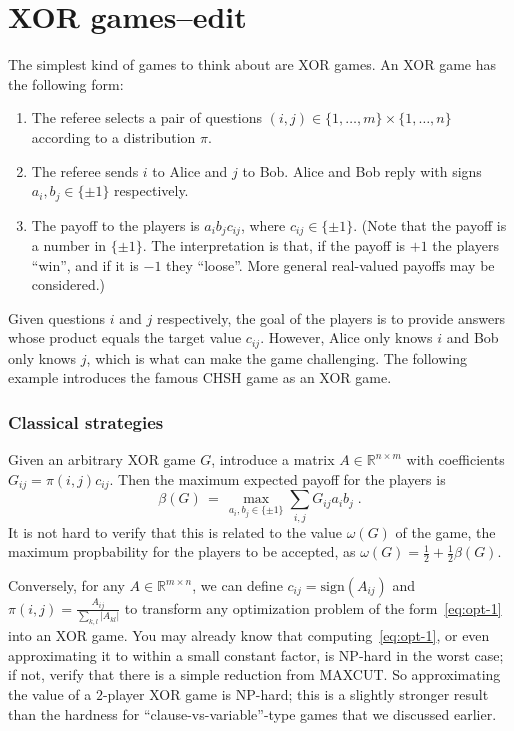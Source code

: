 \documentclass{report}
\theoremstyle{plain}
\theoremstyle{definition}
\theoremstyle{remark}
\newcommand{\R}{\ensuremath{\mathbb{R}}}
\numberwithin{equation}{subsection}
\begin{document}
\chapter{XOR games--edit}
\label{chapzz:xorgames}

The simplest kind of games to think about are XOR games. An XOR game has the following form:
\begin{enumerate}
  \item The referee selects a pair of questions $(i,j)\in \{1,\ldots, m\}\times \{1,\ldots, n\}$
   according to a distribution $\pi$. 
  \item The referee sends $i$ to Alice and $j$ to Bob. Alice and Bob reply with signs $a_i,b_j\in\{\pm 1\}$ respectively.
  \item The payoff to the players is $a_ib_jc_{ij}$, where $c_{ij}\in\{\pm 1\}$. (Note that the payoff is a number in $\{\pm 1\}$. The interpretation is that, if the payoff is $+1$ the players ``win'', and if it is $-1$ they ``loose''. More general real-valued payoffs may be considered.)
\end{enumerate}
Given questions $i$ and $j$ respectively, the goal of the players is to provide answers whose product equals the target value $c_{ij}$. However, Alice only knows $i$ and Bob only knows $j$, which is what can make the game challenging. The following example introduces the famous CHSH game as an XOR game. 



\subsection{Classical strategies}
\label{section:classicalstrats}

Given an arbitrary XOR game $G$, introduce a matrix $A\in\R^{n\times m}$ with coefficients $G_{ij}=\pi(i,j)c_{ij}$. Then the maximum expected payoff for the players is
 \begin{equation}\label{eq:opt-1}
 \beta(G) \,=\, \max_{a_i,b_j\in\{\pm 1\}}\sum_{i,j} G_{ij}a_ib_j \;.
 \end{equation}
It is not hard to verify that this is related to the value $\omega(G)$ of the game, the maximum propbability for the players to be accepted, as $\omega(G) = \frac{1}{2} + \frac{1}{2}\beta(G)$. 

Conversely, for any $A\in \R^{m\times n}$, we can define $c_{ij}=\text{sign}(A_{ij})$ and $\pi(i,j)=\frac{A_{ij}}{\sum_{k,l}|A_{kl}|}$ to transform any optimization problem of the form~\eqref{eq:opt-1} into an XOR game. You may already know that computing~\eqref{eq:opt-1}, or even approximating it to within a small constant factor, is NP-hard in the worst case; if not, verify that there is a simple reduction from MAXCUT. So approximating the value of a $2$-player XOR game is NP-hard; this is a slightly stronger result than the hardness for ``clause-vs-variable''-type games that we discussed earlier. 
\end{document}
